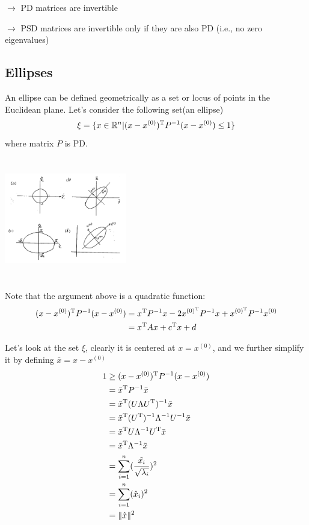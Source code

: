 \qquad $\rightarrow$ PD matrices are invertible

\qquad $\rightarrow$ PSD matrices are invertible only if they are also PD (i.e., no zero eigenvalues)



\subsection{Ellipses} 

An ellipse can be defined geometrically as a set or locus of points in the Euclidean plane. Let's consider the following set(an ellipse)
$$
\xi = \{x\in \mathbb{R}^n \vert (x - x^{(0)})^{{\rm T}} P^{-1}(x - x^{(0)}) \leq 1 \}
$$
where matrix $P$ is PD.

\begin{marginfigure}
	\centering
	\includegraphics[width=2.1in,height=2.1in]{figures/ch03/figure2.jpg}
\end{marginfigure}

Note that the argument above is a quadratic function:
\begin{align*}
(x - x^{(0)})^{{\rm T}}P^{-1}(x - x^{(0)}) &= x^{{\rm T}}P^{-1}x - 2x^{(0)^{{\rm T}}}P^{-1}x + x^{(0)^{{\rm T}}}P^{-1}x^{(0)}\\
&= x^{{\rm T}}Ax + c^{{\rm T}}x + d
\end{align*}

Let's look at the set $\xi$, clearly it is centered at $x = x^{(0)}$, and we further simplify it by defining $\bar{x}=x-x^{(0)}$
\begin{align*}
1 &\geq (x - x^{(0)})^{{\rm T}}P^{-1}(x - x^{(0)})\\
&= \bar{x}^{{\rm T}}P^{-1}\bar{x}\\
&= \bar{x}^{{\rm T}}(U\Lambda U^{{\rm T}})^{-1}\bar{x}\\
&= \bar{x}^{{\rm T}}(U^{{\rm T}})^{-1}\Lambda^{-1}U^{-1}\bar{x}\\
&= \bar{x}^{{\rm T}}U\Lambda^{-1}U^{{\rm T}}\bar{x}\\
&= \tilde{x}^{{\rm T}}\Lambda^{-1}\tilde{x}\\
&= \sum^n_{i=1}(\frac{\tilde{x_i}}{\sqrt{\lambda_i}})^2\\
&= \sum^n_{i=1}(\hat{x}_i)^2\\
&= \Vert \hat{x}\Vert^2
\end{align*}



